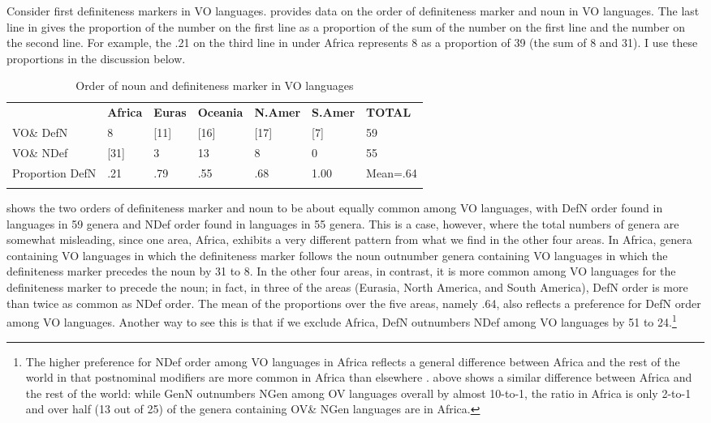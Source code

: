 \documentclass[output=paper]{langsci/langscibook}
\begin{document}
Consider first definiteness markers in VO languages.  provides data on the order of definiteness marker and noun in VO languages. The last line in  gives the proportion of the number on the first line as a proportion of the sum of the number on the first line and the number on the second line. For example, the .21 on the third line in  under Africa represents 8 as a proportion of 39 (the sum of 8 and 31). I use these proportions in the discussion below.

\begin{table}
\begin{tabularx}{\textwidth}{XXXXXXX} 
\lsptoprule
& \bfseries Africa & \bfseries Euras & \bfseries Oceania & \bfseries N.Amer & \bfseries S.Amer & \bfseries TOTAL\\
VO\& DefN & 8 & [11] & [16] & [17] & [7] & 59\\
VO\& NDef & [31] & 3 & 13 & 8 & 0 & 55\\
Proportion DefN & .21 & .79 & .55 & .68 & 1.00 & Mean=.64\\
\lspbottomrule
\end{tabularx}
\caption{\label{tab:dryer:8}Order of noun and definiteness marker in VO languages}
\end{table}

 shows the two orders of definiteness marker and noun to be about equally common among VO languages, with DefN order found in languages in 59 genera and NDef order found in languages in 55 genera. This is a case, however, where the total numbers of genera are somewhat misleading, since one area, Africa, exhibits a very different pattern from what we find in the other four areas. In Africa, genera containing VO languages in which the definiteness marker follows the noun outnumber genera containing VO languages in which the definiteness marker precedes the noun by 31 to 8. In the other four areas, in contrast, it is more common among VO languages for the definiteness marker to precede the noun; in fact, in three of the areas (Eurasia, North America, and South America), DefN order is more than twice as common as NDef order. The mean of the proportions over the five areas, namely .64, also reflects a preference for DefN order among VO languages. Another way to see this is that if we exclude Africa, DefN outnumbers NDef among VO languages by 51 to 24.\footnote{The higher preference for NDef order among VO languages in Africa reflects a general difference between Africa and the rest of the world in that postnominal modifiers are more common in Africa than elsewhere \citep{Dryer2010}.  above shows a similar difference between Africa and the rest of the world: while GenN outnumbers NGen among OV languages overall by almost 10-to-1, the ratio in Africa is only 2-to-1 and over half (13 out of 25) of the genera containing OV\& NGen languages are in Africa.}
\end{document}
